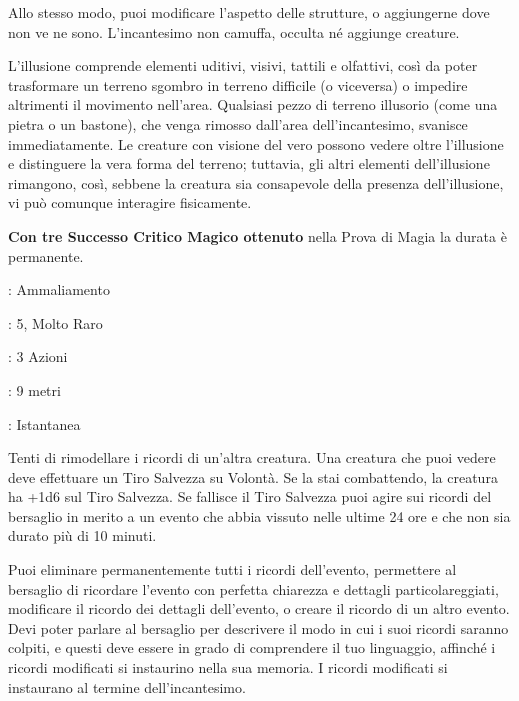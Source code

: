 \begin{multicols}{2}
Allo stesso modo, puoi modificare l'aspetto delle strutture, o aggiungerne dove non ve ne sono. L'incantesimo non camuffa, occulta né aggiunge creature.

L'illusione comprende elementi uditivi, visivi, tattili e olfattivi, così da poter trasformare un terreno sgombro in terreno difficile (o viceversa) o impedire altrimenti il movimento nell'area. Qualsiasi pezzo di terreno illusorio (come una pietra o un bastone), che venga rimosso dall'area dell'incantesimo, svanisce immediatamente. Le creature con visione del vero possono vedere oltre l'illusione e distinguere la vera forma del terreno; tuttavia, gli altri elementi dell'illusione rimangono, così, sebbene la creatura sia consapevole della presenza dell'illusione, vi può comunque interagire fisicamente.

\textbf{Con tre Successo Critico Magico ottenuto} nella Prova di Magia la durata è permanente.

\noindent\colorbox{OBSSgold!10}{
\begin{minipage}{0.95\linewidth}
\begin{description}[noitemsep, topsep=0pt, parsep=0pt, partopsep=0pt, leftmargin=0cm, labelwidth=1.3cm]
	\item[\textbf{Lista}]: Ammaliamento
	\item[\textbf{Livello}]: 5, Molto Raro
	\item[\textbf{Lancio}]: 3 Azioni
	\item[\textbf{Gittata}]: 9 metri
	\item[\textbf{Durata}]: Istantanea
\end{description}
\end{minipage}}\smallskip

Tenti di rimodellare i ricordi di un'altra creatura. Una creatura che puoi vedere deve effettuare un Tiro Salvezza su Volontà. Se la stai combattendo, la creatura ha +1d6 sul Tiro Salvezza. Se fallisce il Tiro Salvezza puoi agire sui ricordi del bersaglio in merito a un evento che abbia vissuto nelle ultime 24 ore e che non sia durato più di 10 minuti.

Puoi eliminare permanentemente tutti i ricordi dell'evento, permettere al bersaglio di ricordare l'evento con perfetta chiarezza e dettagli particolareggiati, modificare il ricordo dei dettagli dell'evento, o creare il ricordo di un altro evento. Devi poter parlare al bersaglio per descrivere il modo in cui i suoi ricordi saranno colpiti, e questi deve essere in grado di comprendere il tuo linguaggio, affinché i ricordi modificati si instaurino nella sua memoria.
I ricordi modificati si instaurano al termine dell'incantesimo.


\end{multicols}

